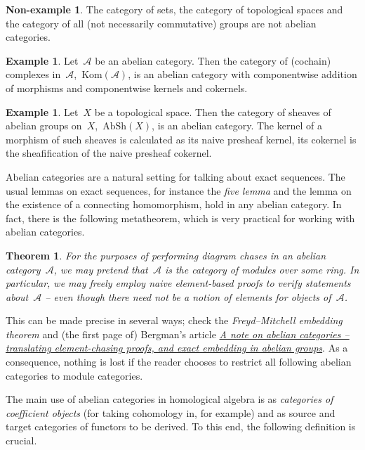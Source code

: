 \documentclass{amsart}
\theoremstyle{definition}
\newtheorem{ex}[defn]{Example}
\newtheorem{non-ex}[defn]{Non-example}
\theoremstyle{plain}
\newtheorem{thm}[defn]{Theorem}
\theoremstyle{remark}
\newcommand{\A}{\mathcal{A}}
\newcommand{\Kom}{\mathrm{Kom}}
\newcommand{\AbSh}{\mathrm{AbSh}}
\newcommand{\?}{\,{:}\,}
\renewcommand{\_}{\mathpunct{.}\,}
\begin{document}
\begin{non-ex}The category of sets, the category of topological spaces and the
category of all (not necessarily commutative) groups are not abelian
categories.\end{non-ex}

\begin{ex}Let~$\A$ be an abelian category. Then the category of (cochain)
complexes in~$\A$,~$\Kom(\A)$, is an abelian category with componentwise
addition of morphisms and componentwise kernels and cokernels.\end{ex}

\begin{ex}Let~$X$ be a topological space. Then the category of sheaves of
abelian groups on~$X$,~$\AbSh(X)$, is an abelian category. The kernel of a
morphism of such sheaves is calculated as its naive presheaf kernel, its
cokernel is the sheafification of the naive presheaf cokernel.\end{ex}

Abelian categories are a natural setting for talking about exact sequences. The
usual lemmas on exact sequences, for instance the \emph{five lemma} and the
lemma on the existence of a connecting homomorphism, hold in any abelian
category. In fact, there is the following metatheorem, which is very practical
for working with abelian categories.

\begin{thm}For the purposes of performing diagram chases in an abelian
category~$\A$, we may pretend that~$\A$ is the category of modules over some
ring. In particular, we may freely employ naive element-based proofs to verify
statements about~$\A$ -- even though there need not be a notion of elements for
objects of~$\A$.\end{thm}

This can be made precise in several ways; check the \emph{Freyd--Mitchell
embedding theorem} and (the first page of) Bergman's article
\href{https://math.berkeley.edu/~gbergman/papers/unpub/elem-chase.pdf}{\emph{A
note on abelian categories -- translating element-chasing proofs, and exact
embedding in abelian groups}}. As a consequence, nothing is lost if the reader
chooses to restrict all following abelian categories to module categories.

The main use of abelian categories in homological algebra is as
\emph{categories of coefficient objects} (for taking cohomology in, for
example) and as source and target categories of functors to be derived. To this
end, the following definition is crucial.
\end{document}
